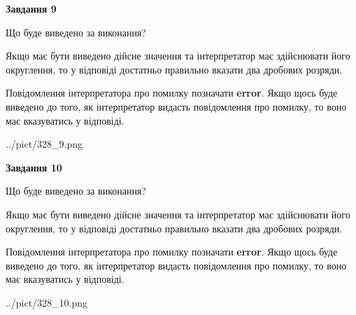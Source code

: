 \documentclass[12pt, ukrainian]{article}
\begin{document}
{\begin {Large}
{\begin {center}\textbf{Завдання 9}\end {center}}\par
Що буде виведено за виконання? \par

Якщо має бути виведено дійсне значення та інтерпретатор має здійснювати його округлення, 
то у відповіді достатньо правильно вказати два дробових розряди.

Повідомлення інтерпретатора про помилку позначати \textbf{error}.
Якщо щось буде виведено до того, як інтерпретатор видасть повідомлення про помилку, 
то воно має вказуватись у відповіді. \par

\begin{center}
	{../pict/328_9.png}
\end{center}
\newpage

{\begin {center}\textbf{Завдання 10}\end {center}}\par
Що буде виведено за виконання? \par

Якщо має бути виведено дійсне значення та інтерпретатор має здійснювати його округлення, 
то у відповіді достатньо правильно вказати два дробових розряди.

Повідомлення інтерпретатора про помилку позначати \textbf{error}.
Якщо щось буде виведено до того, як інтерпретатор видасть повідомлення про помилку, 
то воно має вказуватись у відповіді. \par

\begin{center}
	{../pict/328_10.png}
\end{center}
\newpage

\end {Large}}
\end{document}
